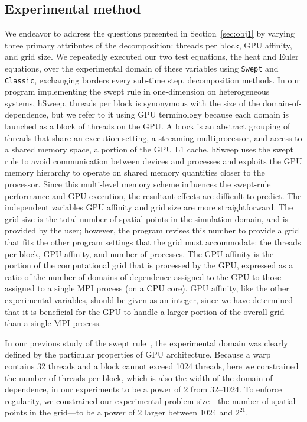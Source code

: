 
\subsection{Experimental method} \label{sec:ExpMethod}

We endeavor to address the questions presented in Section~\ref{sec:obj1} by varying
three primary attributes of the decomposition: threads per block, GPU affinity, and grid size.
We repeatedly executed our two test equations, the heat and Euler equations, over the
experimental domain of these variables using \texttt{Swept} and \texttt{Classic}, exchanging borders every
sub-time step, decomposition methods.
In our program implementing the swept rule in one-dimension on heterogeneous systems, hSweep,
threads per block is synonymous with the size of the domain-of-dependence, but we refer to it using GPU terminology because each domain is launched as a block of threads on the GPU.
A block is an abstract grouping of threads that share an execution setting, a streaming multiprocessor, and access to a shared memory space, a portion of the GPU L1 cache.
hSweep uses the swept rule to avoid communication between devices and processes and exploits the
GPU memory hierarchy to operate on shared memory quantities closer to the processor.
Since this multi-level memory scheme influences the swept-rule performance and GPU execution, the resultant effects are difficult to predict.
The independent variables GPU affinity and grid size are more straightforward.
The grid size is the total number of spatial points in the simulation domain, and is provided
by the user; however, the program revises this number to provide a grid that fits the other program settings
that the grid must accommodate: the threads per block, GPU affinity, and number of processes.
The GPU affinity is the portion of the computational grid that is processed by the GPU,
expressed as a ratio of the number of domains-of-dependence assigned to the GPU to those assigned to a single MPI process (on a CPU core).
GPU affinity, like the other experimental variables, should be given as an integer, since we have
determined that it is beneficial for the GPU to handle a larger portion of the overall grid
than a single MPI process.

In our previous study of the swept rule~\cite{OurJCP}, the experimental domain was clearly
defined by the particular properties of GPU architecture.
Because a warp contains 32 threads and a block cannot exceed 1024 threads, here we constrained
the number of threads per block, which is also the width of the domain of dependence, in our experiments
to be a power of 2 from \numrange{32}{1024}.
To enforce regularity, we constrained our experimental problem size---the number of spatial points in the
grid---to be a power of 2 larger between \num{1024} and $2^{21}$.

